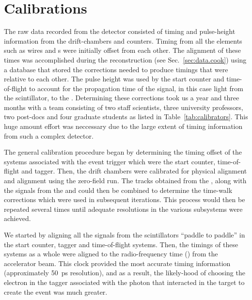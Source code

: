 \section{\label{sec:data.calib}Calibrations}

The raw data recorded from the  detector consisted of timing and pulse-height information from the drift-chambers and counters. Timing from all the elements such as wires and s were initially offset from each other. The alignment of these times was accomplished during the reconstruction (see Sec.~\ref{sec:data.cook}) using a database that stored the corrections needed to produce timings that were relative to each other. The  pulse height was used by the start counter and time-of-flight to account for the propagation time of the signal, in this case light from the scintillator, to the . Determining these corrections took us a year and three months with a team consisting of two  staff scientists, three university professors, two post-docs and four graduate students as listed in Table~\ref{tab:calibrators}. This huge amount effort was neccessary due to the large extent of timing information from such a complex detector.


The general calibration procedure began by determining the timing offset of the systems associated with the event trigger which were the start counter, time-of-flight and tagger. Then, the drift chambers were calibrated for physical alignment and  alignment using the zero-field run. The tracks obtained from the , along with the  signals from the  and  could then be combined to determine the time-walk corrections which were used in subsequent iterations. This process would then be repeated several times until adequate resolutions in the various subsystems were achieved.

We started by aligning all the  signals from the scintillators ``paddle to paddle'' in the start counter, tagger and time-of-flight systems. Then, the timings of these systems as a whole were aligned to the radio-frequency time () from the accelerator beam. This  clock provided the most accurate timing information (approximately 50~ps resolution), and as a result, the likely-hood of choosing the electron in the tagger associated with the photon that interacted in the target to create the event was much greater.

